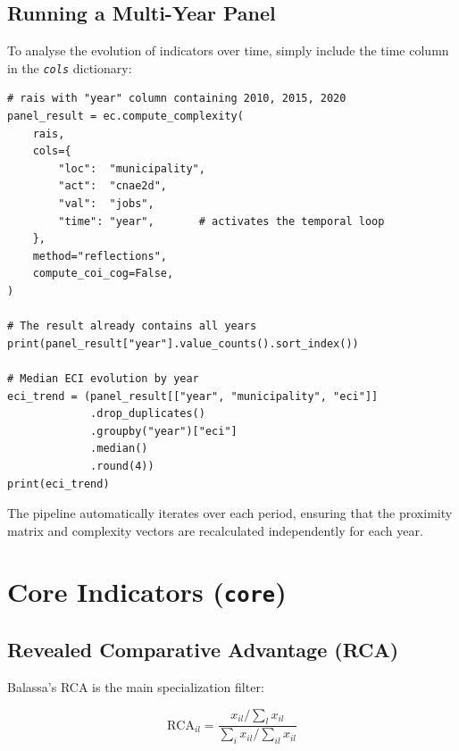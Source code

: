 \documentclass[12pt, a4paper]{article}
\newcommand{\argm}[1]{\textit{\texttt{#1}}}
\begin{document}
\subsection{Running a Multi-Year Panel}

To analyse the evolution of indicators over time,
simply include the time column in the \argm{cols} dictionary:

\begin{lstlisting}[caption={Panel execution --- multiple years}]
# rais with "year" column containing 2010, 2015, 2020
panel_result = ec.compute_complexity(
    rais,
    cols={
        "loc":  "municipality",
        "act":  "cnae2d",
        "val":  "jobs",
        "time": "year",       # activates the temporal loop
    },
    method="reflections",
    compute_coi_cog=False,
)

# The result already contains all years
print(panel_result["year"].value_counts().sort_index())

# Median ECI evolution by year
eci_trend = (panel_result[["year", "municipality", "eci"]]
             .drop_duplicates()
             .groupby("year")["eci"]
             .median()
             .round(4))
print(eci_trend)
\end{lstlisting}

\begin{notebox}
  The pipeline automatically iterates over each period, ensuring that
  the proximity matrix and complexity vectors are recalculated
  independently for each year.
\end{notebox}



\section{Core Indicators (\texttt{core})}

\subsection{Revealed Comparative Advantage (RCA)}

Balassa's RCA is the main specialization filter:

\[
  \text{RCA}_{il} = \frac{x_{il} / \sum_l x_{il}}
                         {\sum_i x_{il} / \sum_{il} x_{il}}
\]
\end{document}
